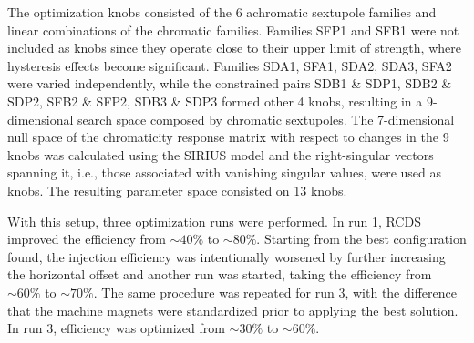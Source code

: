 \documentclass[a4paper,
               keeplastbox,   %
               ]{jacow}
\begin{document}
The optimization knobs consisted of the 6 achromatic sextupole families and linear combinations of the chromatic families. Families SFP1 and SFB1 were not included as knobs since they operate close to their upper limit of strength, where hysteresis effects become significant.  Families SDA1, SFA1, SDA2, SDA3, SFA2 were varied independently, while the constrained pairs SDB1 \& SDP1, SDB2 \& SDP2, SFB2 \& SFP2, SDB3 \& SDP3 formed other 4 knobs, resulting in a 9-dimensional search space composed by chromatic sextupoles. The 7-dimensional null space of the chromaticity response matrix with respect to changes in the 9 knobs was calculated using the SIRIUS model and the right-singular vectors spanning it, i.e., those associated with vanishing singular values, were used as knobs. The resulting parameter space consisted on 13 knobs. 

With this setup, three optimization runs were performed. In run 1, RCDS improved the efficiency from $\sim40\%$ to $\sim80\%$. Starting from the best configuration found, the injection efficiency was intentionally worsened by further increasing the horizontal offset and another run was started, taking the efficiency from $\sim60\%$ to $\sim70\%$. The same procedure was repeated for run 3, with the difference that the machine magnets were standardized prior to applying the best solution. In run 3, efficiency was optimized from $\sim30\%$ to $\sim60\%$.
 
\end{document}
